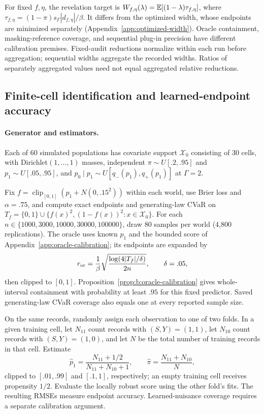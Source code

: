 For fixed $f,\eta$, the revelation target is
$W_{f,\eta}(\lambda)=\mathbb{E}[(1-\lambda)\tau_{f,\eta}]$, where
$\tau_{f,\eta}=(1-\pi)s_\Gamma|d_{f,\eta}|/\beta$.
It differs from the optimized width, whose endpoints are minimized separately
(Appendix~\ref{app:optimized-width}). Oracle containment, masking-reference
coverage, and sequential plug-in precision have different calibration premises.
Fixed-audit reductions normalize within each run before aggregation; sequential
widths aggregate the recorded widths. Ratios of separately aggregated values
need not equal aggregated relative reductions.

\subsection{Finite-cell identification and learned-endpoint accuracy}
\label{app:finite-sample-experiments}

\paragraph{Generator and estimators.}
Each of 60 simulated populations has covariate support $\mathcal X_0$ consisting of 30
cells, with Dirichlet$(1,\ldots,1)$ masses, independent $\pi\sim U[.2,.95]$ and $p_1\sim
U[.05,.95]$, and $p_0\mid p_1\sim U[q_-(p_1),q_+(p_1)]$ at $\Gamma=2$.

Fix $f=\operatorname{clip}_{[0,1]}(p_1+N(0,.15^2))$ within each world,
use Brier loss and $\alpha=.75$, and compute exact endpoints and generating-law
CVaR on $T_f=\{0,1\}\cup\{f(x)^2,(1-f(x))^2:x\in\mathcal X_0\}$.
For each $n\in\{1000,3000,10000,30000,100000\}$, draw 80 samples per world
(4,800 replications). The oracle uses known $p_1$ and the bounded score of
Appendix~\ref{app:oracle-calibration}; its endpoints are expanded by
\[
r_{\rm or}=\frac1\beta\sqrt{\frac{\log(4|T_f|/\delta)}{2n}},\qquad \delta=.05,
\]
then clipped to $[0,1]$. Proposition~\ref{prop:b:oracle-calibration} gives
whole-interval containment with probability at least $.95$ for this fixed predictor.
Saved generating-law CVaR coverage also equals one at every reported sample size.

On the same records, randomly assign each observation to one of two folds. In a given training cell, let $N_{11}$ count records with $(S,Y)=(1,1)$, let $N_{10}$ count records with $(S,Y)=(1,0)$, and let $N$ be the total number of training records in that cell. Estimate
\[
\widehat p_1=\frac{N_{11}+1/2}{N_{11}+N_{10}+1},
\qquad
\widehat\pi=\frac{N_{11}+N_{10}}{N},
\]
clipped to $[.01,.99]$ and $[.1,1]$, respectively; an empty training cell receives propensity $1/2$. Evaluate the locally robust score using the other fold's fits. The resulting RMSEs measure endpoint accuracy. Learned-nuisance coverage requires a separate calibration argument.

